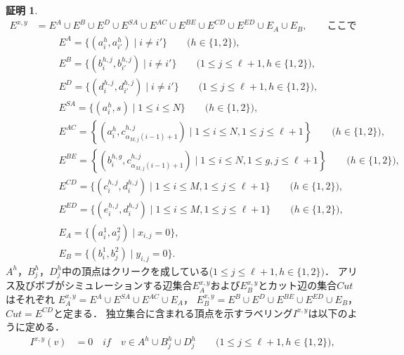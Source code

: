\documentclass[12pt]{thesis}
\theoremstyle{definition}
\newtheorem*{prf*}{証明}
\begin{document}
\begin{prf*}
\begin{align*}
E^{x,y} &= E^{A} \cup E^{B} \cup E^{D} \cup E^{SA} \cup E^{AC} 
\cup E^{BE} \cup E^{CD} \cup E^{ED} \cup E_{A} \cup E_{B}, \quad \quad \text{ここで}\\
&\phantom{=} \quad E^{A} = \{(a^{h}_{i}, a^{h}_{i'})  \mid i \neq i'\} \quad \quad \text{($h \in \{1, 2\}$)}, \\
&\phantom{=} \quad E^{B} = \{(b^{h,j}_{i}, b^{h,j}_{i'})  \mid i \neq i'\} \quad \quad \text{($1\leq j \leq \ell+1, h \in \{1, 2\}$)}, \\
&\phantom{=} \quad E^{D} = \{(d^{h,j}_{i}, d^{h,j}_{i'})  \mid i \neq i'\} \quad \quad \text{($1\leq j \leq \ell+1, h \in \{1, 2\}$)}, \\
&\phantom{=} \quad E^{SA} = \{(a^{h}_{i}, s) \mid 1\leq i \leq N\}  \quad \quad \text{($h \in \{1, 2\}$)}, \\
&\phantom{=} \quad E^{AC} = \left\{ \left(a^{h}_{i},c^{h,j}_{\alpha_{M,j}(i-1)+1}\right) \mid 1\leq i \leq N,1\leq j \leq \ell+1\right\} \quad \quad \text{($h \in \{1, 2\}$)}, \\
&\phantom{=} \quad E^{BE} = \left\{ \left(b^{h,g}_{i},c^{h,j}_{\alpha_{M,j}(i-1)+1}\right) \mid 1\leq i \leq N,1\leq g,j \leq \ell+1\right\} \quad \quad \text{($h \in \{1, 2\}$)}, \\
&\phantom{=} \quad E^{CD} = \{(c^{h, j}_{i}, d^{h, j}_{i}) \mid 1\leq i \leq M,1\leq j \leq \ell+1\} \quad \quad \text{($h \in \{1, 2\}$)}, \\
&\phantom{=} \quad E^{ED} = \{(e^{h, j}_{i}, d^{h, j}_{i}) \mid 1\leq i \leq M,1\leq j \leq \ell+1\} \quad \quad \text{($h \in \{1, 2\}$)}, \\
&\phantom{=} \quad E_{A} = \{(a^{1}_{i},a^{2}_{j}) \mid x_{i,j}=0\}, \\
&\phantom{=} \quad E_{B} = \{(b^{1}_{i},b^{2}_{j}) \mid y_{i,j}=0\}.
\end{align*}
$A^{h}$，$B^{h}_{j}$，$D^{h}_{j}$中の頂点はクリークを成している($1\leq j \leq \ell+1, h \in \{1, 2\})$．
アリス及びボブがシミュレーションする辺集合$E^{x,y}_A$および$E^{x,y}_B$とカット辺の集合$\mathit{Cut}$はそれぞれ
$E^{x,y}_{A} = E^{A} \cup E^{SA} \cup E^{AC} \cup E_{A}$，
$E^{x,y}_{B} = E^{B} \cup E^{D} \cup E^{BE} \cup E^{ED} \cup E_{B}$，
$\mathit{Cut} = E^{CD}$と定まる．
独立集合に含まれる頂点を示すラベリング$I^{x,y}$は以下のように定める．
\begin{align*}
I^{x,y}(v) &= 0 \quad if \quad v \in A^{h} \cup B^{h}_{j} \cup D^{h}_{j} \quad \quad \text{($1\leq j \leq \ell+1, h \in \{1, 2\}$)}, \\

\end{align*}
\end{prf*}
\end{document}
